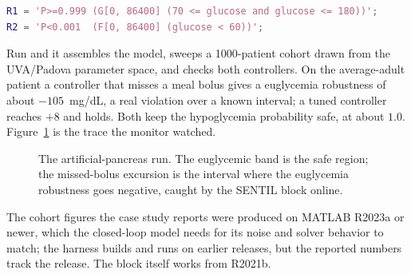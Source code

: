 \begin{lstlisting}[language=Matlab]
R1 = 'P>=0.999 (G[0, 86400] (70 <= glucose and glucose <= 180))';
R2 = 'P<0.001  (F[0, 86400] (glucose < 60))';
\end{lstlisting}

Run  and it assembles the model, sweeps a 1000-patient cohort drawn from the UVA/Padova parameter space, and checks both controllers. On the average-adult patient a controller that misses a meal bolus gives a euglycemia robustness of about $-105$~mg/dL, a real violation over a known interval; a tuned controller reaches $+8$ and holds. Both keep the hypoglycemia probability safe, at about $1.0$. Figure~\ref{fig:glucose} is the trace the monitor watched.

\begin{figure}[h]
\centering
{}
\caption{The artificial-pancreas run. The euglycemic band is the safe region; the missed-bolus excursion is the interval where the euglycemia robustness goes negative, caught by the SENTIL block online.}
\label{fig:glucose}
\end{figure}

\begin{notebox}
The cohort figures the case study reports were produced on MATLAB R2023a or newer, which the closed-loop model needs for its noise and solver behavior to match; the harness builds and runs on earlier releases, but the reported numbers track the release. The block itself works from R2021b.
\end{notebox}